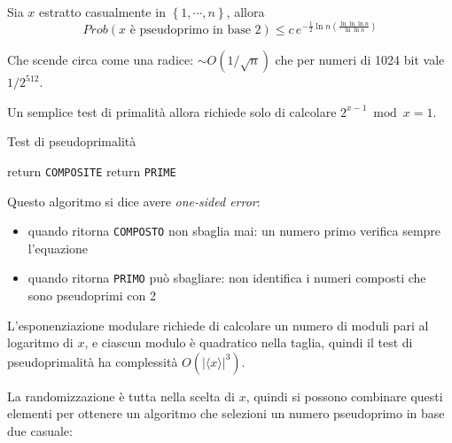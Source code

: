 \begin{theorem}
    [Pomerance]
    \label{teo:pomerance}
    Sia $ x $ estratto casualmente in $
    \left\{ 1, \cdots, n \right\}
    $, allora
    \begin{equation*}
        Prob\left( 
            \text{$x$ è pseudoprimo in base $2$}
        \right) \leq
        c \, 
        e^{
            -\frac{1}{2}
            \ln n
            \left( 
                \frac{
                    \ln \ln \ln n
                }{
                    \ln \ln n
                }
            \right)
        }
    \end{equation*}
\end{theorem}
Che scende circa come una radice: $
\sim O \left( 
    1 / \sqrt{n}
\right)
$ che per numeri di 1024 bit vale $
1 / 2^{512}
$.

Un semplice test di primalità allora richiede solo di calcolare $
2^{x-1} \bmod x = 1
$. 

\begin{algorithm}[H]
\caption{Test di pseudoprimalità}\label{alg:pseudoprime}
\begin{algorithmic}[1]
            \State return \texttt{COMPOSITE}
        \Else
            \State return \texttt{PRIME}
        \EndIf
    \EndProcedure
\end{algorithmic}
\end{algorithm}
\noindent
Questo algoritmo si dice avere \emph{one-sided error}:
\begin{itemize}[noitemsep,parsep=0pt,partopsep=0pt,topsep=0pt]
    \item quando ritorna \texttt{COMPOSTO} non sbaglia mai: un numero primo verifica sempre l'equazione
    \item quando ritorna \texttt{PRIMO} può sbagliare: non identifica i numeri composti che sono pseudoprimi con 2
\end{itemize}
L'esponenziazione modulare richiede di calcolare un numero di moduli pari al logaritmo di $x$, e ciascun modulo è quadratico nella taglia, quindi il test di pseudoprimalità ha complessità $
O\left( |
    \langle x \rangle
|^3 \right)
$.

La randomizzazione è tutta nella scelta di $x$,
quindi si possono combinare questi elementi per ottenere un algoritmo che selezioni un numero pseudoprimo in base due casuale:


